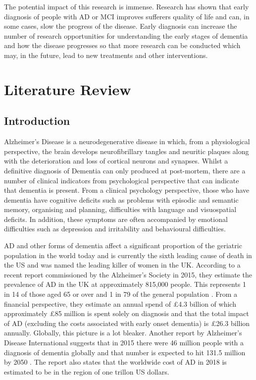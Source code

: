 \documentclass{article}
\begin{document}
\par
The potential impact of this research is immense. Research has shown that early diagnosis of people with AD or MCI improves sufferers quality of life and can, in some cases, slow the progress of the disease. Early diagnosis can increase the number of research opportunities for understanding the early stages of dementia and how the disease progresses so that more research can be conducted which may, in the future, lead to new treatments and other interventions. 
\section{Literature Review}
\subsection{Introduction}
Alzheimer's Disease is a neurodegenerative disease in which, from a physiological perspective, the brain develops neurofibrillary tangles and neuritic plaques along with the deterioration and loss of cortical neurons and synapses. Whilst a definitive diagnosis of Dementia can only produced at post-mortem, there are a number of clinical indicators from psychological perspective that can indicate that dementia is present. From a clinical psychology perspective, those who have dementia have cognitive deficits such as problems with episodic and semantic memory, organising and planning, difficulties with language and visuospatial deficits\cite{AmericanPsychiatricAssociation2013}. In addition, these symptoms are often accompanied by emotional difficulties such as depression and irritability and behavioural difficulties. 
\par
AD and other forms of dementia affect a significant proportion of the geriatric population in the world today and is currently the sixth leading cause of death in the US and was named the leading killer of women in the UK. According to a recent report commissioned by the Alzheimer's Society in 2015, they estimate the prevalence of AD in the UK at approximately 815,000 people. This represents 1 in 14 of those aged 65 or over and 1 in 79 of the general population \cite{Sturrock2016}. From a financial perspective, they estimate an annual spend of £4.3 billion of which approximately £85 million is spent solely on diagnosis and that the total impact of AD (excluding the costs associated with early onset dementia) is £26.3 billion annually. Globally, this picture is a lot bleaker. Another report by Alzheimer's Disease International suggests that in 2015 there were 46 million people with a diagnosis of dementia globally and that number is expected to hit 131.5 million by 2050 \cite{Prince2015}. The report also states that the worldwide cost of AD in 2018 is estimated to be in the region of one trillon US dollars.
\end{document}
